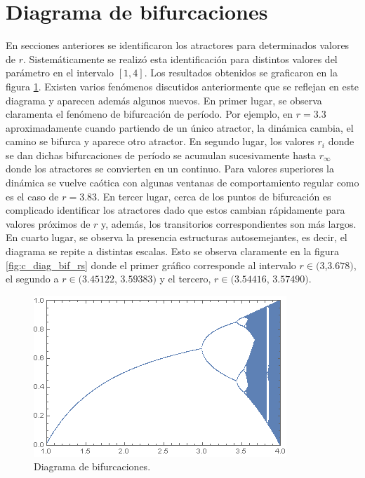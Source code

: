 \documentclass[aps,prb,twocolumn,superscriptaddress,floatfix,longbibliography]{revtex4-2}
\newcounter{para}
\begin{document}
\section{\label{sec:c}Diagrama de bifurcaciones}

En secciones anteriores se identificaron los atractores para determinados valores de $r$. Sistemáticamente se realizó esta identificación para distintos valores del parámetro en el intervalo $[1,4]$. Los resultados obtenidos se graficaron en la figura \ref{fig:c_diag_bif_r_1}. Existen varios fenómenos discutidos anteriormente que se reflejan en este diagrama y aparecen además algunos nuevos. En primer lugar, se observa claramenta el fenómeno de bifurcación de período. Por ejemplo, en $r = 3.3$ aproximadamente cuando partiendo de un único atractor, la dinámica cambia, el camino se bifurca y aparece otro atractor. En segundo lugar, los valores $r_i$ donde se dan dichas bifurcaciones de período se acumulan sucesivamente hasta $r_\infty$ donde los atractores se convierten en un continuo. Para valores superiores la dinámica se vuelve caótica con algunas ventanas de comportamiento regular como es el caso de $r = 3.83$. En tercer lugar, cerca de los puntos de bifurcación es complicado identificar los atractores dado que estos cambian rápidamente para valores próximos de $r$ y, además, los transitorios correspondientes son más largos. En cuarto lugar, se observa la presencia estructuras autosemejantes, es decir, el diagrama se repite a distintas escalas. Esto se observa claramente en la figura \ref{fig:c_diag_bif_rs} donde el primer gráfico corresponde al intervalo $r \in (3$,$3.678)$, el segundo a $r \in (3.45122$, $3.59383)$ y el tercero, $r \in  (3.54416$, $3.57490)$.

\begin{figure}[htp]
    \includegraphics[clip=true,width=0.7\columnwidth]{c_diag_bif_r_1.png}
    \caption{Diagrama de bifurcaciones.}
     \label{fig:c_diag_bif_r_1}
\end{figure}
\end{document}
